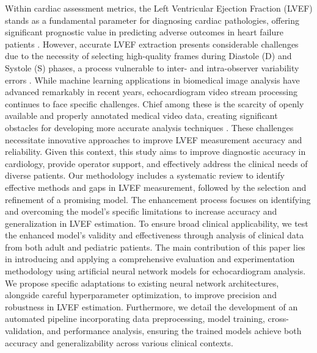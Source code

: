 \documentclass[a4paper,fleqn]{cas-dc}
\begin{document}
Within cardiac assessment metrics, the Left Ventricular Ejection Fraction (LVEF) stands as a fundamental parameter for diagnosing cardiac pathologies, offering significant prognostic value in predicting adverse outcomes in heart failure patients \cite{kosaraju_grigorova_goyal_makaryus}. However, accurate LVEF extraction presents considerable challenges due to the necessity of selecting high-quality frames during Diastole (D) and Systole (S) phases, a process vulnerable to inter- and intra-observer variability errors \cite{Ouyang2020}.
While machine learning applications in biomedical image analysis have advanced remarkably in recent years, echocardiogram video stream processing continues to face specific challenges. Chief among these is the scarcity of openly available and properly annotated medical video data, creating significant obstacles for developing more accurate analysis techniques \cite{Ouyang2020}. These challenges necessitate innovative approaches to improve LVEF measurement accuracy and reliability.
Given this context, this study aims to improve diagnostic accuracy in cardiology, provide operator support, and effectively address the clinical needs of diverse patients. Our methodology includes a systematic review to identify effective methods and gaps in LVEF measurement, followed by the selection and refinement of a promising model. The enhancement process focuses on identifying and overcoming the model's specific limitations to increase accuracy and generalization in LVEF estimation. To ensure broad clinical applicability, we test the enhanced model's validity and effectiveness through analysis of clinical data from both adult and pediatric patients.
The main contribution of this paper lies in introducing and applying a comprehensive evaluation and experimentation methodology using artificial neural network models for echocardiogram analysis. We propose specific adaptations to existing neural network architectures, alongside careful hyperparameter optimization, to improve precision and robustness in LVEF estimation. Furthermore, we detail the development of an automated pipeline incorporating data preprocessing, model training, cross-validation, and performance analysis, ensuring the trained models achieve both accuracy and generalizability across various clinical contexts.
\end{document}
